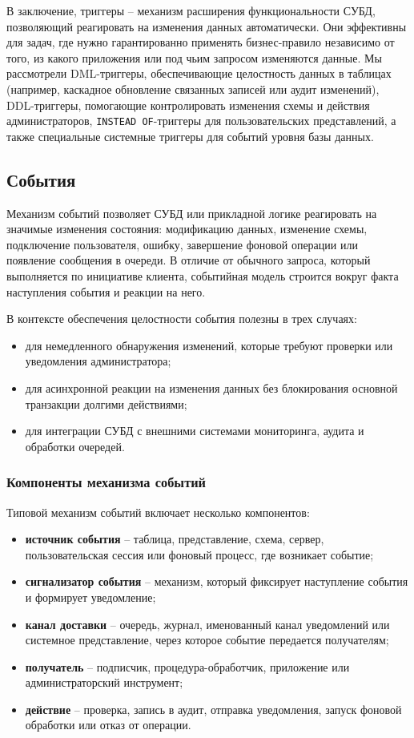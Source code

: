 В заключение, триггеры – механизм расширения функциональности СУБД, позволяющий реагировать на изменения данных автоматически. Они эффективны для задач, где нужно гарантированно применять бизнес-правило независимо от того, из какого приложения или под чьим запросом изменяются данные. Мы рассмотрели DML-триггеры, обеспечивающие целостность данных в таблицах (например, каскадное обновление связанных записей или аудит изменений), DDL-триггеры, помогающие контролировать изменения схемы и действия администраторов, \texttt{INSTEAD OF}-триггеры для пользовательских представлений, а также специальные системные триггеры для событий уровня базы данных. 

\subsection{События}

Механизм событий позволяет СУБД или прикладной логике реагировать на значимые изменения состояния: модификацию данных, изменение схемы, подключение пользователя, ошибку, завершение фоновой операции или появление сообщения в очереди. В отличие от обычного запроса, который выполняется по инициативе клиента, событийная модель строится вокруг факта наступления события и реакции на него.

В контексте обеспечения целостности события полезны в трех случаях:
\begin{itemize}
    \item для немедленного обнаружения изменений, которые требуют проверки или уведомления администратора;
    \item для асинхронной реакции на изменения данных без блокирования основной транзакции долгими действиями;
    \item для интеграции СУБД с внешними системами мониторинга, аудита и обработки очередей.
\end{itemize}

\subsubsection{Компоненты механизма событий}

Типовой механизм событий включает несколько компонентов:
\begin{itemize}
    \item \textbf{источник события} -- таблица, представление, схема, сервер, пользовательская сессия или фоновый процесс, где возникает событие;
    \item \textbf{сигнализатор события} -- механизм, который фиксирует наступление события и формирует уведомление;
    \item \textbf{канал доставки} -- очередь, журнал, именованный канал уведомлений или системное представление, через которое событие передается получателям;
    \item \textbf{получатель} -- подписчик, процедура-обработчик, приложение или администраторский инструмент;
    \item \textbf{действие} -- проверка, запись в аудит, отправка уведомления, запуск фоновой обработки или отказ от операции.
\end{itemize}

